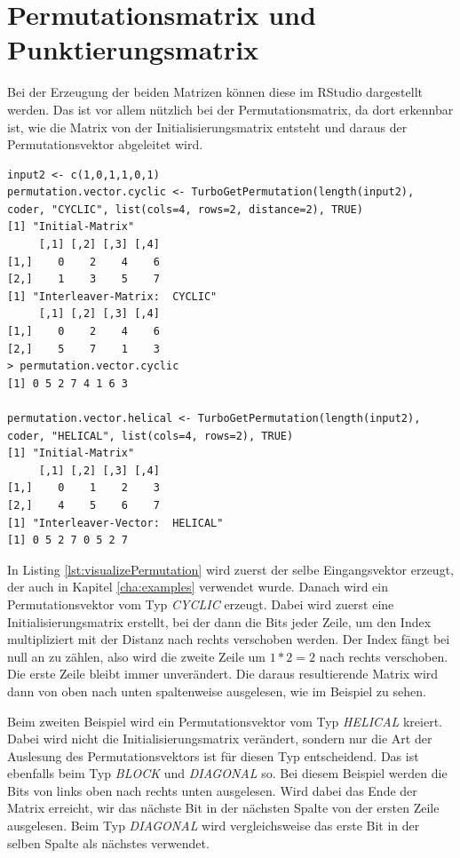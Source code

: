 \section{Permutationsmatrix und Punktierungsmatrix}
\label{sec:visualization_punctuationPermutation}
Bei der Erzeugung der beiden Matrizen können diese im RStudio dargestellt werden. Das ist vor allem nützlich bei der Permutationsmatrix, da dort erkennbar ist, wie die Matrix von der Initialisierungsmatrix entsteht und daraus der Permutationsvektor abgeleitet wird. 

\begin{lstlisting}[caption=Visualisierung der Permutationsmatrix, label={lst:visualizePermutation}, float=!ht]
input2 <- c(1,0,1,1,0,1)
permutation.vector.cyclic <- TurboGetPermutation(length(input2), coder, "CYCLIC", list(cols=4, rows=2, distance=2), TRUE)
[1] "Initial-Matrix"
     [,1] [,2] [,3] [,4]
[1,]    0    2    4    6
[2,]    1    3    5    7
[1] "Interleaver-Matrix:  CYCLIC"
     [,1] [,2] [,3] [,4]
[1,]    0    2    4    6
[2,]    5    7    1    3
> permutation.vector.cyclic
[1] 0 5 2 7 4 1 6 3

permutation.vector.helical <- TurboGetPermutation(length(input2), coder, "HELICAL", list(cols=4, rows=2), TRUE)
[1] "Initial-Matrix"
     [,1] [,2] [,3] [,4]
[1,]    0    1    2    3
[2,]    4    5    6    7
[1] "Interleaver-Vector:  HELICAL"
[1] 0 5 2 7 0 5 2 7
\end{lstlisting}

In Listing \ref{lst:visualizePermutation} wird zuerst der selbe Eingangsvektor erzeugt, der auch in Kapitel \ref{cha:examples} verwendet wurde. Danach wird ein Permutationsvektor vom Typ \emph{CYCLIC} erzeugt. Dabei wird zuerst eine Initialisierungsmatrix erstellt, bei der dann die Bits jeder Zeile, um den Index multipliziert mit der Distanz nach rechts verschoben werden. Der Index fängt bei null an zu zählen, also wird die zweite Zeile um $1*2 = 2$ nach rechts verschoben. Die erste Zeile bleibt immer unverändert. Die daraus resultierende Matrix wird dann von oben nach unten spaltenweise ausgelesen, wie im Beispiel zu sehen.

Beim zweiten Beispiel wird ein Permutationsvektor vom Typ \emph{HELICAL} kreiert. Dabei wird nicht die Initialisierungsmatrix verändert, sondern nur die Art der Auslesung des Permutationsvektors ist für diesen Typ entscheidend. Das ist ebenfalls beim Typ \emph{BLOCK} und \emph{DIAGONAL} so. Bei diesem Beispiel werden die Bits von links oben nach rechts unten ausgelesen. Wird dabei das Ende der Matrix erreicht, wir das nächste Bit in der nächsten Spalte von der ersten Zeile ausgelesen. Beim Typ \emph{DIAGONAL} wird vergleichsweise das erste Bit in der selben Spalte als nächstes verwendet.

